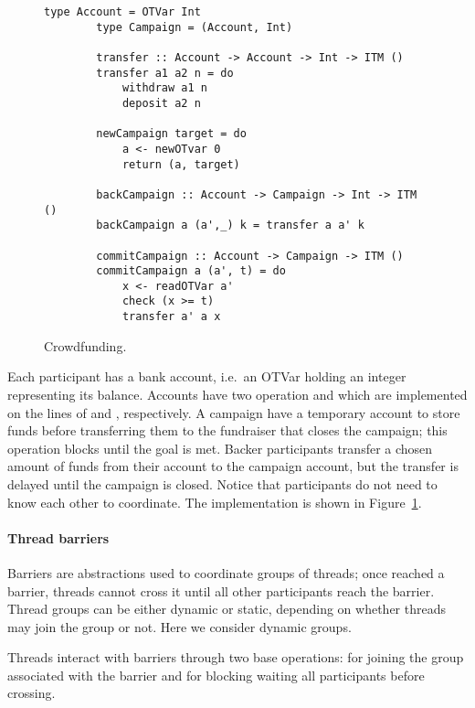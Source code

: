 \begin{figure}
    \centering
    \begin{Verbatim}[tabsize=3, gobble=2]
        type Account = OTVar Int
        type Campaign = (Account, Int)

        transfer :: Account -> Account -> Int -> ITM ()
        transfer a1 a2 n = do
            withdraw a1 n
            deposit a2 n

        newCampaign target = do
            a <- newOTvar 0
            return (a, target)
        
        backCampaign :: Account -> Campaign -> Int -> ITM ()
        backCampaign a (a',_) k = transfer a a' k
        
        commitCampaign :: Account -> Campaign -> ITM ()
        commitCampaign a (a', t) = do
            x <- readOTVar a'
            check (x >= t)
            transfer a' a x
    \end{Verbatim}
    \caption{Crowdfunding.}
    \label{fig:example-funding}
\end{figure}

Each participant has a bank account, i.e.~an OTVar holding an integer 
representing its balance. Accounts have two operation  
and  which are implemented on the lines of 
 and , respectively.
A campaign have a temporary account to store funds
before transferring them to the fundraiser that closes
the campaign; this operation blocks until the goal 
is met. %
Backer participants transfer a chosen amount of funds from their
account to the campaign account, but the transfer is delayed until the campaign is closed. Notice that participants do not need to know each other to coordinate.
The implementation is shown in Figure~\ref{fig:example-funding}.

\paragraph{Thread barriers}
Barriers are abstractions used to coordinate groups of threads;
once reached a barrier, threads cannot cross it
until all other participants reach the barrier. 
Thread groups can be either dynamic or static, depending
on whether threads may join %
the group or not. Here we consider dynamic groups. 

Threads interact with barriers through two base operations:  for  
joining the group associated with the barrier and  for blocking 
waiting all participants before crossing.

